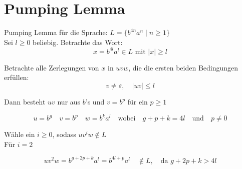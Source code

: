\documentclass[a4paper, 11pt]{article}
\begin{document}
\section{Pumping Lemma}

Pumping Lemma für die Sprache: $L = \{ b^{4n} a^n \; | \; n \geq 1 \}$  \\


\noindent Sei $l \geq 0$ beliebig.
Betrachte das Wort:
$$x = b^{4l}a^l \in L \text{ mit } |x| \geq l$$

\noindent Betrachte alle Zerlegungen von $x$ in $uvw$, die die ersten beiden Bedingungen erfüllen: 
$$v \neq \varepsilon, \quad |uv| \leq l$$

\noindent Dann besteht $uv$ nur aus $b$'s und $v = b^p$ für ein $p \geq 1$

$$u = b^g \quad v = b^p \quad w = b^ka^l \quad \text{wobei} \quad g + p + k = 4l \quad \text{und} \quad p \neq 0$$

\noindent Wähle ein $i \geq 0$, sodass $uv^iw \notin L$ \\
Für $i = 2$

$$uv^2w = b^{g + 2p + k} a^l = b^{4l+p} a^l \quad \notin L, \quad \text{da } g + 2p + k > 4l$$
\end{document}
